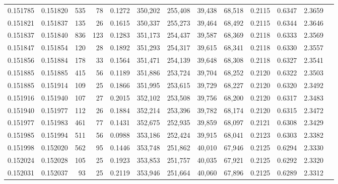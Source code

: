 \begin{tabular}{rrrrrrrrrrrrr}
0.151785 & 0.151820 &   535 &  78 &                                     0.1272 & 350,202 & 255,408 &  39,438 &  68,518 & 0.2115 & 0.6347 & 2.3659 \\
0.151821 & 0.151837 &   135 &  26 &                                     0.1615 & 350,337 & 255,273 &  39,464 &  68,492 & 0.2115 & 0.6344 & 2.3646 \\
0.151837 & 0.151840 &   836 & 123 &                                     0.1283 & 351,173 & 254,437 &  39,587 &  68,369 & 0.2118 & 0.6333 & 2.3569 \\
0.151847 & 0.151854 &   120 &  28 &                                     0.1892 & 351,293 & 254,317 &  39,615 &  68,341 & 0.2118 & 0.6330 & 2.3557 \\
0.151856 & 0.151884 &   178 &  33 &                                     0.1564 & 351,471 & 254,139 &  39,648 &  68,308 & 0.2118 & 0.6327 & 2.3541 \\
0.151885 & 0.151885 &   415 &  56 &                                     0.1189 & 351,886 & 253,724 &  39,704 &  68,252 & 0.2120 & 0.6322 & 2.3503 \\
0.151885 & 0.151914 &   109 &  25 &                                     0.1866 & 351,995 & 253,615 &  39,729 &  68,227 & 0.2120 & 0.6320 & 2.3492 \\
0.151916 & 0.151940 &   107 &  27 &                                     0.2015 & 352,102 & 253,508 &  39,756 &  68,200 & 0.2120 & 0.6317 & 2.3483 \\
0.151940 & 0.151977 &   112 &  26 &                                     0.1884 & 352,214 & 253,396 &  39,782 &  68,174 & 0.2120 & 0.6315 & 2.3472 \\
0.151977 & 0.151983 &   461 &  77 &                                     0.1431 & 352,675 & 252,935 &  39,859 &  68,097 & 0.2121 & 0.6308 & 2.3429 \\
0.151985 & 0.151994 &   511 &  56 &                                     0.0988 & 353,186 & 252,424 &  39,915 &  68,041 & 0.2123 & 0.6303 & 2.3382 \\
0.151998 & 0.152020 &   562 &  95 &                                     0.1446 & 353,748 & 251,862 &  40,010 &  67,946 & 0.2125 & 0.6294 & 2.3330 \\
0.152024 & 0.152028 &   105 &  25 &                                     0.1923 & 353,853 & 251,757 &  40,035 &  67,921 & 0.2125 & 0.6292 & 2.3320 \\
0.152031 & 0.152037 &    93 &  25 &                                     0.2119 & 353,946 & 251,664 &  40,060 &  67,896 & 0.2125 & 0.6289 & 2.3312 \\

\end{tabular}
